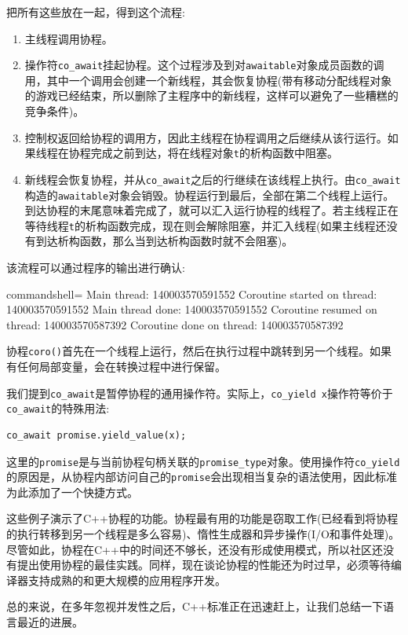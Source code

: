 把所有这些放在一起，得到这个流程:

\begin{enumerate}
\item
主线程调用协程。

\item
操作符\texttt{co\_await}挂起协程。这个过程涉及到对\texttt{awaitable}对象成员函数的调用，其中一个调用会创建一个新线程，其会恢复协程(带有移动分配线程对象的游戏已经结束，所以删除了主程序中的新线程，这样可以避免了一些糟糕的竞争条件)。

\item
控制权返回给协程的调用方，因此主线程在协程调用之后继续从该行运行。如果线程在协程完成之前到达，将在线程对象\texttt{t}的析构函数中阻塞。

\item 
新线程会恢复协程，并从\texttt{co\_await}之后的行继续在该线程上执行。由\texttt{co\_await}构造的\texttt{awaitable}对象会销毁。协程运行到最后，全部在第二个线程上运行。到达协程的末尾意味着完成了，就可以汇入运行协程的线程了。若主线程正在等待线程\texttt{t}的析构函数完成，现在则会解除阻塞，并汇入线程(如果主线程还没有到达析构函数，那么当到达析构函数时就不会阻塞)。
\end{enumerate}

该流程可以通过程序的输出进行确认:

\begin{tcblisting}{commandshell={}}
Main thread: 140003570591552
Coroutine started on thread: 140003570591552
Main thread done: 140003570591552
Coroutine resumed on thread: 140003570587392
Coroutine done on thread: 140003570587392
\end{tcblisting}

协程\texttt{coro()}首先在一个线程上运行，然后在执行过程中跳转到另一个线程。如果有任何局部变量，会在转换过程中进行保留。

我们提到\texttt{co\_await}是暂停协程的通用操作符。实际上，\texttt{co\_yield x}操作符等价于\texttt{co\_await}的特殊用法:

\begin{lstlisting}[style=styleCXX]
co_await promise.yield_value(x);
\end{lstlisting}

这里的\texttt{promise}是与当前协程句柄关联的\texttt{promise\_type}对象。使用操作符\texttt{co\_yield}的原因是，从协程内部访问自己的\texttt{promise}会出现相当复杂的语法使用，因此标准为此添加了一个快捷方式。

这些例子演示了C++协程的功能。协程最有用的功能是窃取工作(已经看到将协程的执行转移到另一个线程是多么容易)、惰性生成器和异步操作(I/O和事件处理)。尽管如此，协程在C++中的时间还不够长，还没有形成使用模式，所以社区还没有提出使用协程的最佳实践。同样，现在谈论协程的性能还为时过早，必须等待编译器支持成熟的和更大规模的应用程序开发。 

总的来说，在多年忽视并发性之后，C++标准正在迅速赶上，让我们总结一下语言最近的进展。









